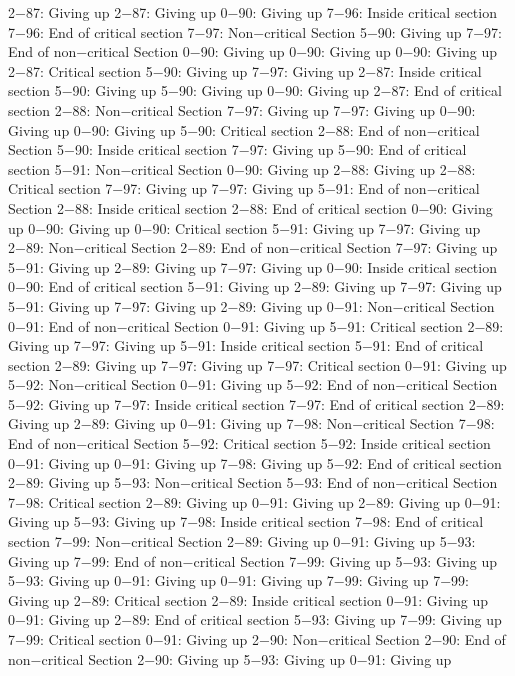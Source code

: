 2−87: Giving up
2−87: Giving up
0−90: Giving up
7−96: Inside critical section
7−96: End of critical section
7−97: Non−critical Section
5−90: Giving up
7−97: End of non−critical Section
0−90: Giving up
0−90: Giving up
0−90: Giving up
2−87: Critical section
5−90: Giving up
7−97: Giving up
2−87: Inside critical section
5−90: Giving up
5−90: Giving up
0−90: Giving up
2−87: End of critical section
2−88: Non−critical Section
7−97: Giving up
7−97: Giving up
0−90: Giving up
0−90: Giving up
5−90: Critical section
2−88: End of non−critical Section
5−90: Inside critical section
7−97: Giving up
5−90: End of critical section
5−91: Non−critical Section
0−90: Giving up
2−88: Giving up
2−88: Critical section
7−97: Giving up
7−97: Giving up
5−91: End of non−critical Section
2−88: Inside critical section
2−88: End of critical section
0−90: Giving up
0−90: Giving up
0−90: Critical section
5−91: Giving up
7−97: Giving up
2−89: Non−critical Section
2−89: End of non−critical Section
7−97: Giving up
5−91: Giving up
2−89: Giving up
7−97: Giving up
0−90: Inside critical section
0−90: End of critical section
5−91: Giving up
2−89: Giving up
7−97: Giving up
5−91: Giving up
7−97: Giving up
2−89: Giving up
0−91: Non−critical Section
0−91: End of non−critical Section
0−91: Giving up
5−91: Critical section
2−89: Giving up
7−97: Giving up
5−91: Inside critical section
5−91: End of critical section
2−89: Giving up
7−97: Giving up
7−97: Critical section
0−91: Giving up
5−92: Non−critical Section
0−91: Giving up
5−92: End of non−critical Section
5−92: Giving up
7−97: Inside critical section
7−97: End of critical section
2−89: Giving up
2−89: Giving up
0−91: Giving up
7−98: Non−critical Section
7−98: End of non−critical Section
5−92: Critical section
5−92: Inside critical section
0−91: Giving up
0−91: Giving up
7−98: Giving up
5−92: End of critical section
2−89: Giving up
5−93: Non−critical Section
5−93: End of non−critical Section
7−98: Critical section
2−89: Giving up
0−91: Giving up
2−89: Giving up
0−91: Giving up
5−93: Giving up
7−98: Inside critical section
7−98: End of critical section
7−99: Non−critical Section
2−89: Giving up
0−91: Giving up
5−93: Giving up
7−99: End of non−critical Section
7−99: Giving up
5−93: Giving up
5−93: Giving up
0−91: Giving up
0−91: Giving up
7−99: Giving up
7−99: Giving up
2−89: Critical section
2−89: Inside critical section
0−91: Giving up
0−91: Giving up
2−89: End of critical section
5−93: Giving up
7−99: Giving up
7−99: Critical section
0−91: Giving up
2−90: Non−critical Section
2−90: End of non−critical Section
2−90: Giving up
5−93: Giving up
0−91: Giving up
